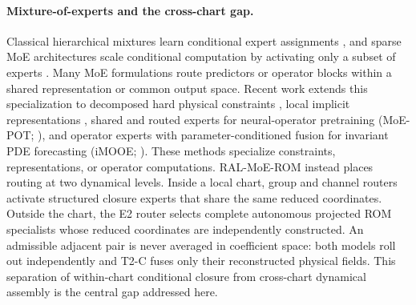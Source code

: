 \paragraph{Mixture-of-experts and the cross-chart gap.}
Classical hierarchical mixtures learn conditional expert assignments
\citep{jacobs1991,jordan1994}, and sparse MoE architectures scale conditional computation
by activating only a subset of experts \citep{shazeer2017,fedus2022}. Many MoE formulations
route predictors or operator blocks within a shared representation or common output space.
Recent work extends this specialization to decomposed hard physical constraints
\citep{ICLR2024_9aeda582}, local implicit representations
\citep{NEURIPS2024_b83fae17}, shared and routed experts for neural-operator pretraining
(MoE-POT; \citealt{NEURIPS2025_2d23a999}), and operator experts with parameter-conditioned
fusion for invariant PDE forecasting (iMOOE; \citealt{ICLR2026_754612bd}). These methods
specialize constraints, representations, or operator computations.
RAL-MoE-ROM instead places routing at two dynamical levels. Inside a local chart, group and channel routers activate
structured closure experts that share the same reduced coordinates. Outside the chart,
the E2 router selects complete autonomous projected ROM specialists whose reduced
coordinates are independently constructed.
An admissible adjacent pair is never averaged in coefficient space: both models roll out
independently and T2-C fuses only their reconstructed physical fields. This separation of
within-chart conditional closure from cross-chart dynamical assembly is the central gap
addressed here.
